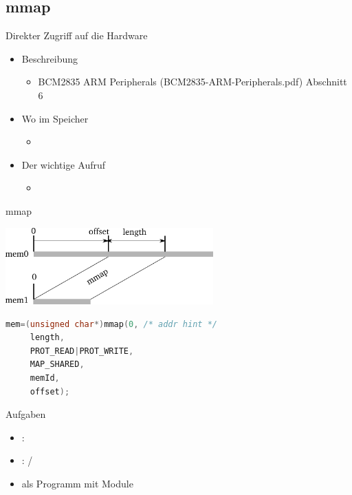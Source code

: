 \documentclass{beamer}
\begin{document}
\subsection{mmap}
\begin{frame}{}{Direkter Zugriff auf die Hardware}
 \begin{itemize}
  \item Beschreibung
   \begin{itemize}
    \item BCM2835 ARM Peripherals (BCM2835-ARM-Peripherals.pdf) Abschnitt 6
   \end{itemize}
  \item Wo im Speicher
   \begin{itemize}
    \item {}
   \end{itemize}
 \item Der wichtige Aufruf
  \begin{itemize}
   \item {}
  \end{itemize}
 \end{itemize}
\end{frame}

\begin{frame}[fragile]{mmap}
\begin{center}
 \includegraphics[width=8cm]{mmap.pdf}
\end{center}
\begin{lstlisting}[language=C]
 mem=(unsigned char*)mmap(0, /* addr hint */
     length,
     PROT_READ|PROT_WRITE,
     MAP_SHARED, 
     memId,
     offset);
\end{lstlisting}
\end{frame}

\begin{frame}{Aufgaben}
 \begin{itemize}
  \item {}:  
  \item {}: /
  \item {} als \cpp Programm mit Module 
 \end{itemize}
\end{frame}
\end{document}
